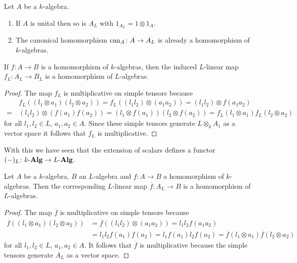 \begin{remark}
  Let $A$ be a $k$-algebra.
  \begin{enumerate}
    \item
    If $A$ is unital then so is $A_L$ with $1_{A_L} = 1 \otimes 1_A$.
    \item
    The canonical homomorphism $\operatorname{can}_A \colon A \to A_L$ is already a homomorphism of $k$-algebras.
  \end{enumerate}
\end{remark}


\begin{lemma}
  If $f \colon A \to B$ is a homomorphism of $k$-algebras, then the induced $L$-linear map $f_L \colon A_L \to B_L$ is a homomorphism of $L$-algebras.
\end{lemma}
\begin{proof}
  The map $f_L$ is multiplicative on simple tensors because
  \begin{align*}
     &\,  f_L((l_1 \otimes a_1)(l_2 \otimes a_2))
    =     f_L((l_1 l_2) \otimes (a_1 a_2))
    =     (l_1 l_2) \otimes f(a_1 a_2) \\
    =&\,  (l_1 l_2) \otimes (f(a_1)f(a_2))
    =     (l_1 \otimes f(a_1)) (l_2 \otimes f(a_2))
    =     f_L(l_1 \otimes a_1) f_L(l_2 \otimes a_2)
  \end{align*}
  for all $l_1, l_2 \in L$, $a_1, a_2 \in A$.
  Since these simple tensors generate $L \otimes_k A_1$ as a vector space it follows that $f_L$ is multiplicative.
\end{proof}
  
  
\begin{remark}
  With this we have seen that the extension of scalars defines a functor $(-)_L \colon k\text{-}\mathbf{Alg} \to L\text{-}\mathbf{Alg}$.
\end{remark}


\begin{lemma}
  \label{lemma: universal property of extension of scalars for algebras}
  Let $A$ be a $k$-algebra, $B$ an $L$-algebra and $f \colon A \to B$ a homomorphism of $k$-algebras.
  Then the corresponding $L$-linear map $\overline{f} \colon A_L \to B$ is a homomorphism of $L$-algebras.
  \begin{proof}
  The map $\overline{f}$ is multiplicative on simple tensors because
    \begin{align*}
          \overline{f}((l_1 \otimes a_1)(l_2 \otimes a_2))
      &=  \overline{f}((l_1 l_2) \otimes (a_1 a_2))
       =  l_1 l_2 f(a_1 a_2)    \\
      &=  l_1 l_2 f(a_1) f(a_2)
       =  l_1 f(a_1) l_2 f(a_2)
       =  \overline{f}(l_1 \otimes a_1) \overline{f}(l_2 \otimes a_2)
    \end{align*}
    for all $l_1, l_2 \in L$, $a_1, a_2 \in A$.
    It follows that $\overline{f}$ is multiplicative because the simple tensors generate $A_L$ as a vector space.
  \end{proof}
\end{lemma}


